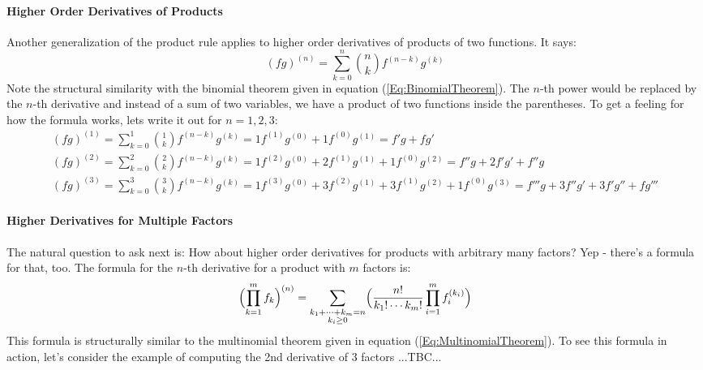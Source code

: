 \paragraph{Higher Order Derivatives of Products}
Another generalization of the product rule applies to higher order derivatives of products of two functions. It says:
\begin{equation}
 (f g)^{(n)} = \sum_{k=0}^n \binom{n}{k}   f^{(n-k)} g^{(k)}
\end{equation}
Note the structural similarity with the binomial theorem given in equation (\ref{Eq:BinomialTheorem}). The $n$-th power would be replaced by the $n$-th derivative and instead of a sum of two variables, we have a product of two functions inside the parentheses. To get a feeling for how the formula works, lets write it out for $n = 1,2,3$:
\begin{eqnarray}
(f g)^{(1)}  = \sum_{k=0}^1 \binom{1}{k} f^{(n-k)} g^{(k)}
             = 1 f^{(1)} g^{(0)} + 1 f^{(0)} g^{(1)} 
             = f' g + f g' \nonumber \\
(f g)^{(2)}  = \sum_{k=0}^2 \binom{2}{k} f^{(n-k)} g^{(k)}
             = 1 f^{(2)} g^{(0)} + 2 f^{(1)} g^{(1)} + 1 f^{(0)} g^{(2)} 
             = f'' g + 2 f' g' + f'' g \nonumber \\
(f g)^{(3)}  = \sum_{k=0}^3 \binom{3}{k} f^{(n-k)} g^{(k)}
             = 1 f^{(3)} g^{(0)} + 3 f^{(2)} g^{(1)} + 3 f^{(1)} g^{(2)} + 1 f^{(0)} g^{(3)} 
             = f''' g + 3 f'' g' + 3 f' g'' +  f g''' \nonumber
\end{eqnarray}




\paragraph{Higher Derivatives for Multiple Factors}
The natural question to ask next is: How about higher order derivatives for products with arbitrary many factors? Yep - there's a formula for that, too. The formula for the $n$-th derivative for a product with $m$ factors is:
\begin{equation}
\Bigl( \prod_{k=1}^{m} f_k \Bigr)^{(n)} =
\sum_{\substack{k_1 + \cdots + k_m = n \\ k_i \geq 0}} 
\Bigl(
\frac{n!}{k_1! \cdots k_m!}
\prod_{i=1}^{m} f_i^{(k_i)} 
\Bigr)
\end{equation}
This formula is structurally similar to the multinomial theorem given in equation (\ref{Eq:MultinomialTheorem}). To see this formula in action, let's consider the example of computing the 2nd derivative of 3 factors ...TBC... 


